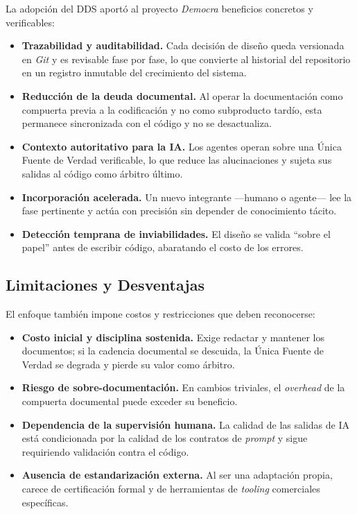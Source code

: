 La adopción del DDS aportó al proyecto \textit{Democra} beneficios concretos y
verificables:

\begin{itemize}[leftmargin=*, itemsep=2pt, topsep=2pt]
    \item \textbf{Trazabilidad y auditabilidad.} Cada decisión de diseño queda
    versionada en \textit{Git} y es revisable fase por fase, lo que convierte al
    historial del repositorio en un registro inmutable del crecimiento del sistema.
    \item \textbf{Reducción de la deuda documental.} Al operar la documentación como
    compuerta previa a la codificación y no como subproducto tardío, esta permanece
    sincronizada con el código y no se desactualiza.
    \item \textbf{Contexto autoritativo para la IA.} Los agentes operan sobre una
    Única Fuente de Verdad verificable, lo que reduce las alucinaciones y sujeta sus
    salidas al código como árbitro último.
    \item \textbf{Incorporación acelerada.} Un nuevo integrante ---humano o agente---
    lee la fase pertinente y actúa con precisión sin depender de conocimiento tácito.
    \item \textbf{Detección temprana de inviabilidades.} El diseño se valida ``sobre
    el papel'' antes de escribir código, abaratando el costo de los errores.
\end{itemize}

\subsection{Limitaciones y Desventajas}
\label{subsec:dds_limitaciones}

El enfoque también impone costos y restricciones que deben reconocerse:

\begin{itemize}[leftmargin=*, itemsep=2pt, topsep=2pt]
    \item \textbf{Costo inicial y disciplina sostenida.} Exige redactar y mantener
    los documentos; si la cadencia documental se descuida, la Única Fuente de Verdad
    se degrada y pierde su valor como árbitro.
    \item \textbf{Riesgo de sobre-documentación.} En cambios triviales, el
    \textit{overhead} de la compuerta documental puede exceder su beneficio.
    \item \textbf{Dependencia de la supervisión humana.} La calidad de las salidas de
    IA está condicionada por la calidad de los contratos de \textit{prompt} y sigue
    requiriendo validación contra el código.
    \item \textbf{Ausencia de estandarización externa.} Al ser una adaptación propia,
    carece de certificación formal y de herramientas de \textit{tooling} comerciales
    específicas.
\end{itemize}

